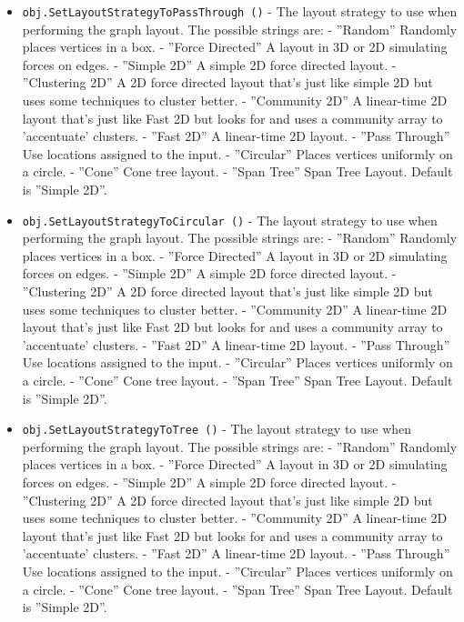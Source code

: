 \begin{itemize}
\item  \verb|obj.SetLayoutStrategyToPassThrough ()| -  The layout strategy to use when performing the graph layout.
 The possible strings are:
  - ''Random''         Randomly places vertices in a box.
  - ''Force Directed'' A layout in 3D or 2D simulating forces on edges.
  - ''Simple 2D''      A simple 2D force directed layout.
  - ''Clustering 2D''  A 2D force directed layout that's just like
                     simple 2D but uses some techniques to cluster better.
  - ''Community 2D''   A linear-time 2D layout that's just like
                    Fast 2D but looks for and uses a community 
                    array to 'accentuate' clusters.
  - ''Fast 2D''       A linear-time 2D layout.
  - ''Pass Through''  Use locations assigned to the input.
  - ''Circular''      Places vertices uniformly on a circle.
  - ''Cone''          Cone tree layout.
  - ''Span Tree''     Span Tree Layout.
 Default is ''Simple 2D''.

\item  \verb|obj.SetLayoutStrategyToCircular ()| -  The layout strategy to use when performing the graph layout.
 The possible strings are:
  - ''Random''         Randomly places vertices in a box.
  - ''Force Directed'' A layout in 3D or 2D simulating forces on edges.
  - ''Simple 2D''      A simple 2D force directed layout.
  - ''Clustering 2D''  A 2D force directed layout that's just like
                     simple 2D but uses some techniques to cluster better.
  - ''Community 2D''   A linear-time 2D layout that's just like
                    Fast 2D but looks for and uses a community 
                    array to 'accentuate' clusters.
  - ''Fast 2D''       A linear-time 2D layout.
  - ''Pass Through''  Use locations assigned to the input.
  - ''Circular''      Places vertices uniformly on a circle.
  - ''Cone''          Cone tree layout.
  - ''Span Tree''     Span Tree Layout.
 Default is ''Simple 2D''.

\item  \verb|obj.SetLayoutStrategyToTree ()| -  The layout strategy to use when performing the graph layout.
 The possible strings are:
  - ''Random''         Randomly places vertices in a box.
  - ''Force Directed'' A layout in 3D or 2D simulating forces on edges.
  - ''Simple 2D''      A simple 2D force directed layout.
  - ''Clustering 2D''  A 2D force directed layout that's just like
                     simple 2D but uses some techniques to cluster better.
  - ''Community 2D''   A linear-time 2D layout that's just like
                    Fast 2D but looks for and uses a community 
                    array to 'accentuate' clusters.
  - ''Fast 2D''       A linear-time 2D layout.
  - ''Pass Through''  Use locations assigned to the input.
  - ''Circular''      Places vertices uniformly on a circle.
  - ''Cone''          Cone tree layout.
  - ''Span Tree''     Span Tree Layout.
 Default is ''Simple 2D''.


\end{itemize}
